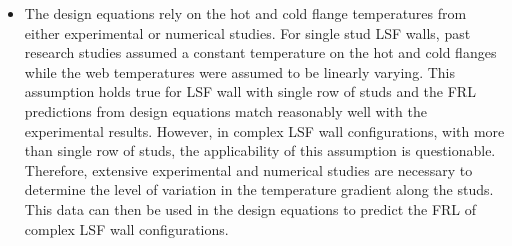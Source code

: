 \begin{itemize}
	\item The design equations rely on the hot and cold flange temperatures from either experimental or numerical studies. For single stud LSF walls, past research studies assumed a constant temperature on the hot and cold flanges while the web temperatures were assumed to be linearly varying. This assumption holds true for LSF wall with single row of studs and the FRL predictions from design equations match reasonably well with the experimental results. However, in complex LSF wall configurations, with more than single row of studs, the applicability of this assumption is questionable. Therefore, extensive experimental and numerical studies are necessary to determine the level of variation in the temperature gradient along the studs. This data can then be used in the design equations to predict the FRL of complex LSF wall configurations.  
\end{itemize}